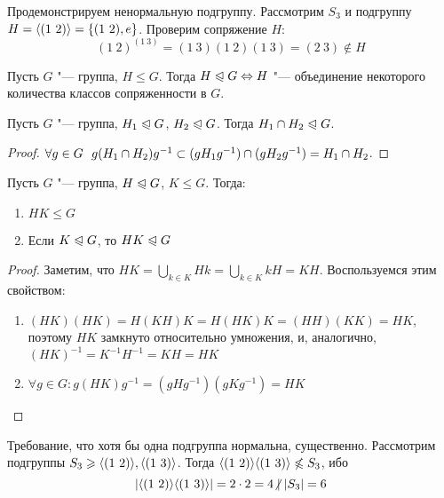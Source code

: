 \begin{example}
	Продемонстрируем ненормальную подгруппу. Рассмотрим $S_3$ и подгруппу $H = \langle(1\ 2)\rangle = \{(1\ 2), e\}$. Проверим сопряжение $H$:
	\[
	(1\ 2)^{(1 \ 3)} = (1\ 3)(1\ 2)(1\ 3) = (2\ 3) \notin H
	\]
\end{example}

\begin{exercise}
	Пусть $G$ "--- группа, $H \le G$. Тогда $H \normal G \hm\Leftrightarrow H$ "--- объединение некоторого количества классов сопряженности в $G$.
\end{exercise}

\begin{proposition}
	Пусть $G$ "--- группа, $H_1 \trianglelefteqslant G$, $H_2 \trianglelefteqslant G$. Тогда $H_1 \cap H_2 \hm\normal G$.
\end{proposition}

\begin{proof}
	$\forall g \in G\ \ g(H_1 \cap H_2)g^{-1} \subset (gH_1g^{-1}) \cap (gH_2g^{-1}) \hm= H_1 \cap H_2$.
\end{proof}

\begin{proposition}
	Пусть $G$ "--- группа, $H \trianglelefteqslant G$, $K \le G$. Тогда:
	\begin{enumerate}
		\item $HK \le G$
		\item Если $K \trianglelefteqslant G$, то $HK \trianglelefteqslant G$
	\end{enumerate}
\end{proposition}

\begin{proof}
	Заметим, что $HK = \bigcup_{k \in K}Hk = \bigcup_{k \in K}kH = KH$. Воспользуемся этим свойством:
	\begin{enumerate}
		\item $(HK)(HK) = H(KH)K = H(HK)K = (HH)(KK) = HK$, поэтому $HK$ замкнуто относительно умножения, и, аналогично, $(HK)^{-1} = K^{-1}H^{-1} = KH = HK$
		\item $\forall g \in G: g(HK)g^{-1} = (gHg^{-1})(gKg^{-1}) = HK$
	\end{enumerate}
\end{proof}

\begin{example}
	Требование, что хотя бы одна подгруппа нормальна, существенно. Рассмотрим подгруппы $S_3 \geqslant \langle(1\ 2)\rangle, \langle(1\ 3)\rangle$. Тогда $\gl(1\ 2)\gr\gl(1\ 3)\gr \not\le S_3$, ибо
	\[
		|\gl(1\ 2)\gr\gl(1\ 3)\gr| = 2 \cdot 2 = 4 \centernot\mid |S_3| = 6
	\]
\end{example}


